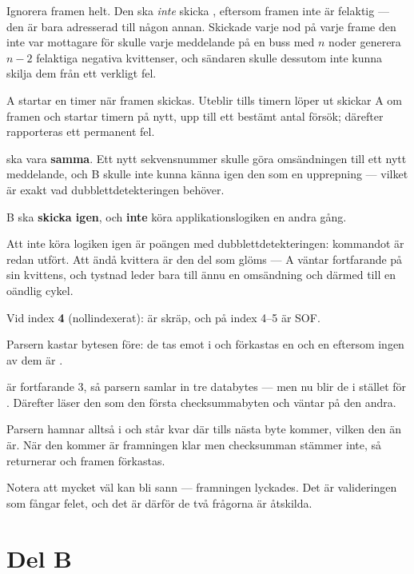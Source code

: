  Ignorera framen helt. Den ska \emph{inte} skicka , eftersom framen inte är
felaktig --- den är bara adresserad till någon annan. Skickade varje nod  på varje frame
den inte var mottagare för skulle varje meddelande på en buss med $n$ noder generera $n-2$
felaktiga negativa kvittenser, och sändaren skulle dessutom inte kunna skilja dem från ett
verkligt fel.

 A startar en timer när framen skickas. Uteblir  tills timern löper ut skickar A
om framen och startar timern på nytt, upp till ett bestämt antal försök; därefter rapporteras ett
permanent fel.

 ska vara \textbf{samma}. Ett nytt sekvensnummer skulle göra omsändningen till ett nytt
meddelande, och B skulle inte kunna känna igen den som en upprepning --- vilket är exakt vad
dubblettdetekteringen behöver.

 B ska \textbf{skicka  igen}, och \textbf{inte} köra applikationslogiken en andra
gång.

Att inte köra logiken igen är poängen med dubblettdetekteringen: kommandot är redan utfört. Att
ändå kvittera är den del som glöms --- A väntar fortfarande på sin kvittens, och tystnad leder bara
till ännu en omsändning och därmed till en oändlig cykel.

 Vid index \textbf{4} (nollindexerat):  är skräp, och  på
index 4--5 är SOF.

Parsern kastar bytesen före: de tas emot i  och förkastas en och en eftersom
ingen av dem är .

  är fortfarande 3, så parsern samlar in tre databytes --- men nu blir de
 i stället för . Därefter läser den  som den första
checksummabyten och väntar på den andra.

Parsern hamnar alltså i  och står kvar där tills nästa byte kommer, vilken den
än är. När den kommer är framningen klar men checksumman stämmer inte, så 
returnerar  och framen förkastas.

Notera att  mycket väl kan bli sann --- framningen lyckades. Det är
valideringen som fångar felet, och det är därför de två frågorna är åtskilda.

\section*{Del B}

